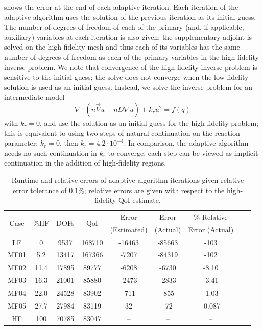 \documentclass[review,sort&compress]{elsarticle}
\theoremstyle{plain} %
\theoremstyle{definition} %
\begin{document}
 shows the error at the end of each adaptive iteration. Each iteration of the adaptive algorithm uses the solution of the previous iteration as its initial guess. The number of degrees of freedom of each of the primary (and, if applicable, auxiliary) variables at each iteration is also given; the supplementary adjoint is solved on the high-fidelity mesh and thus each of its variables has the same number of degrees of freedom as each of the primary variables in the high-fidelity inverse problem. We note that convergence of the high-fidelity inverse problem is sensitive to the initial guess; the solve does not converge when the low-fidelity solution is used as an initial guess. Instead, we solve the inverse problem for an intermediate model
%
\begin{equation}
\nabla\cdot(n\vec{V}u - nD\nabla u) + k_ru^2 = f(q)
\end{equation}
%
with $k_r=0$, and use the solution as an initial guess for the high-fidelity problem; this is equivalent to using two steps of natural continuation on the reaction parameter: $k_r=0$, then $k_r=4.2\cdot10^{-4}$. In comparison, the adaptive algorithm needs no such continuation in $k_r$ to converge; each step can be viewed as implicit continuation in the addition of high-fidelity regions.
%
\begin{table}[htbp]
\centering
\begin{tabular}{|c|c|c|c|c|c|c|c|c|}
\hline
\multirow{2}{*}{Case} & \multirow{2}{*}{$\%$HF} & \multirow{2}{*}{DOFs} & \multirow{2}{*}{QoI} & Error & Error & $\%$ Relative \\
& & & & (Estimated) & (Actual) & Error (Actual)  \\ \hline
LF   & 0    & 9537  & 168710 & -16463 & -85663 & -103    \\
MF01 & 5.2  & 13417 & 167366 & -7207  & -84319 & -102    \\
MF02 & 11.4 & 17895 & 89777  & -6208  & -6730  & -8.10   \\
MF03 & 16.3 & 21001 & 85880  & -2473  & -2833  & -3.41   \\
MF04 & 22.0 & 24528 & 83902  & -711   & -855   & -1.03   \\
MF05 & 27.7 & 27984 & 83119  & 32     & -72    & -0.087  \\
HF   & 100  & 70785 & 83047  & --     & --     & --    \\ \hline
\end{tabular}
\caption{Runtime and relative errors of adaptive algorithm iterations given relative error tolerance of $0.1\%$; relative errors are given with respect to the high-fidelity QoI estimate.}
\label{tab:ref3D_diffmesh}
\end{table}
%
\end{document}
